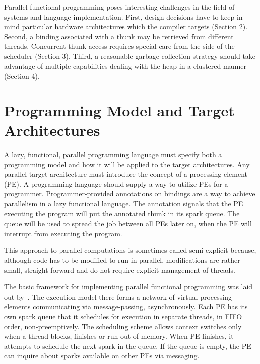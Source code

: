 \documentclass[11pt]{extarticle}
\begin{document}
Parallel functional programming poses interesting challenges in the field of systems and language implementation.
First, design decisions have to keep in mind particular hardware architectures which the compiler targets (Section 2).
Second, a binding associated with a thunk may be retrieved from different threads. Concurrent thunk access requires special care from the side of the scheduler (Section 3). Third, a reasonable garbage collection strategy should take advantage of multiple capabilities dealing with the heap in a clustered manner (Section 4).

\section{Programming Model and Target Architectures}
\label{sec:model}

A lazy, functional, parallel programming language must specify both a programming model and how it will be applied to the target architectures.
Any parallel target architecture must introduce the concept of a processing element (PE). A programming language should supply a way to utilize PEs for a programmer.
Programmer-provided annotations on bindings are a way to achieve parallelism in a lazy functional language. The annotation signals that the PE executing the program will put the annotated thunk in its spark queue. The queue will be used to spread the job between all PEs later on, when the PE will interrupt from executing the program.

This approach to parallel computations is sometimes called semi-explicit because, although code has to be modified to run in parallel, modifications are rather small, straight-forward and do not require explicit management of threads.

The basic framework for implementing parallel functional programming was laid out by~\cite{Trinder96}. The execution model there forms a network of virtual processing elements communicating via message-passing, asynchronously. Each PE has its own spark queue that it schedules for execution in separate threads, in FIFO order, non-preemptively. The scheduling scheme allows context switches only when a thread blocks, finishes or run out of memory. When PE finishes, it attempts to schedule the next spark in the queue. If the queue is empty, the PE can inquire about sparks available on other PEs via messaging.
\end{document}
